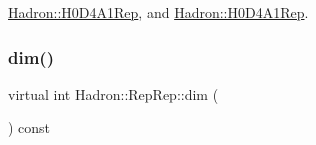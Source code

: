\mbox{\hyperlink{structHadron_1_1H0D4A1Rep_ac5a45aa7f7cdc3ab70b8c164b2e1dce0}{Hadron\+::\+H0\+D4\+A1\+Rep}}, and \mbox{\hyperlink{structHadron_1_1H0D4A1Rep_ac5a45aa7f7cdc3ab70b8c164b2e1dce0}{Hadron\+::\+H0\+D4\+A1\+Rep}}.

\mbox{\label{structHadron_1_1RepRep_a92c8802e5ed7afd7da43ccfd5b7cd92b}} 
\subsubsection{\texorpdfstring{dim()}{dim()}\hspace{0.1cm}{\footnotesize\ttfamily [2/2]}}
{\footnotesize\ttfamily virtual int Hadron\+::\+Rep\+Rep\+::dim (\begin{DoxyParamCaption}{ }\end{DoxyParamCaption}) const\hspace{0.3cm}{\ttfamily [pure virtual]}}



